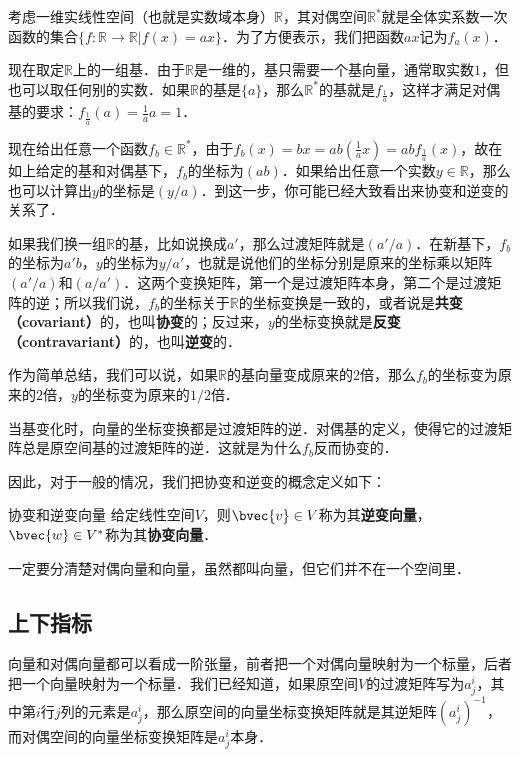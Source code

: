 \begin{example}{}
考虑一维实线性空间（也就是实数域本身）$\mathbb{R}$，其对偶空间$\mathbb{R}^*$就是全体实系数一次函数的集合$\{f:\mathbb{R}\rightarrow\mathbb{R}|f(x)=ax\}$．为了方便表示，我们把函数$ax$记为$f_a(x)$．

现在取定$\mathbb{R}$上的一组基．由于$\mathbb{R}$是一维的，基只需要一个基向量，通常取实数$1$，但也可以取任何别的实数．如果$\mathbb{R}$的基是$\{a\}$，那么$\mathbb{R}^*$的基就是$f_{\frac{1}{a}}$，这样才满足对偶基的要求：$f_{\frac{1}{a}}(a)=\frac{1}{a}a=1$．

现在给出任意一个函数$f_b\in\mathbb{R}^*$，由于$f_b(x)=bx=ab(\frac{1}{a}x)=abf_{\frac{1}{a}}(x)$，故在如上给定的基和对偶基下，$f_b$的坐标为$(ab)$．如果给出任意一个实数$y\in\mathbb{R}$，那么也可以计算出$y$的坐标是$(y/a)$．到这一步，你可能已经大致看出来协变和逆变的关系了．

如果我们换一组$\mathbb{R}$的基，比如说换成$a'$，那么过渡矩阵就是$(a'/a)$．在新基下，$f_b$的坐标为$a'b$，$y$的坐标为$y/a'$，也就是说他们的坐标分别是原来的坐标乘以矩阵$(a'/a)$和$(a/a')$．这两个变换矩阵，第一个是过渡矩阵本身，第二个是过渡矩阵的逆；所以我们说，$f_b$的坐标关于$\mathbb{R}$的坐标变换是一致的，或者说是\textbf{共变（covariant）}的，也叫\textbf{协变}的；反过来，$y$的坐标变换就是\textbf{反变（contravariant）}的，也叫\textbf{逆变}的．

作为简单总结，我们可以说，如果$\mathbb{R}$的基向量变成原来的$2$倍，那么$f_b$的坐标变为原来的$2$倍，$y$的坐标变为原来的$1/2$倍．
\end{example}

当基变化时，向量的坐标变换都是过渡矩阵的逆．对偶基的定义，使得它的过渡矩阵总是原空间基的过渡矩阵的逆．这就是为什么$f_b$反而协变的．

因此，对于一般的情况，我们把协变和逆变的概念定义如下：

\begin{definition}{协变和逆变向量}
给定线性空间$V$，则$\bvec{v}\in V$称为其\textbf{逆变向量}，$\bvec{w}\in V^*$称为其\textbf{协变向量}．
\end{definition}

一定要分清楚对偶向量和向量，虽然都叫向量，但它们并不在一个空间里．



\subsection{上下指标}

向量和对偶向量都可以看成一阶张量，前者把一个对偶向量映射为一个标量，后者把一个向量映射为一个标量．我们已经知道，如果原空间$V$的过渡矩阵写为$a^i_j$，其中第$i$行$j$列的元素是$a^i_j$，那么原空间的向量坐标变换矩阵就是其逆矩阵$(a^i_j)^{-1}$，而对偶空间的向量坐标变换矩阵是$a^i_j$本身．

